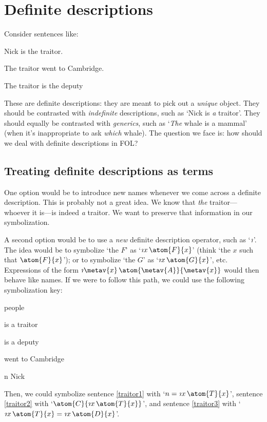 \chapter{Definite descriptions}\label{subsec.defdesc}
Consider sentences like:
	\begin{earg}
		\item[\ex{traitor1}] Nick is the traitor.
		\item[\ex{traitor2}] The traitor went to Cambridge.
		\item[\ex{traitor3}] The traitor is the deputy 
	\end{earg}
These are definite descriptions: they are meant to pick out a \emph{unique} object. They should be contrasted with \emph{indefinite} descriptions, such as `Nick  is \emph{a} traitor'. They should equally be contrasted with \emph{generics}, such as `\emph{The} whale is a mammal' (when it's inappropriate to ask \emph{which} whale). The question we face is: how should we deal with definite descriptions in FOL?


\section{Treating definite descriptions as terms}
One option would be to introduce new names whenever we come across a definite description. This is probably not a great idea. We know that \emph{the} traitor---whoever it is---is indeed \emph{a} traitor. We want to preserve that information in our symbolization.

A second option would be to use a \emph{new} definite description operator, such as `$\maththe$'. The idea would be to symbolize `the $F$' as `$\maththe x\,\atom{F}{x}$'  (think `the $x$ such that $\atom{F}{x}$'); or to symbolize `the $G$' as `$\maththe x\,\atom{G}{x}$', etc. Expressions of the form $\maththe \metav{x}\, \atom{\metav{A}}{\metav{x}}$ would then behave like names. If we were to follow this path, we could use the following symbolization key:
	\begin{ekey}
		\item[\text{domain}] people
		\item[\atom{T}{x}]  is a traitor
		\item[\atom{D}{x}]  is a deputy
		\item[\atom{C}{x}]  went to Cambridge
		\item[n] Nick
	\end{ekey}
Then, we could symbolize sentence \ref{traitor1} with `$n = \maththe x\, \atom{T}{x}$', sentence \ref{traitor2} with `$\atom{C}{\maththe x\,\atom{T}{x}}$', and sentence \ref{traitor3} with `$\maththe x\, \atom{T}{x} = \maththe x\, \atom{D}{x}$'.

